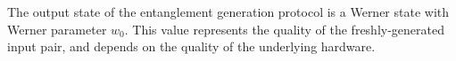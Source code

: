 \documentclass{masterthesis}
\begin{document}
The output state of the entanglement generation protocol is a Werner state with Werner parameter $w_0$. This value represents the quality of the freshly-generated input pair, and depends on the quality of the underlying hardware.






\end{document}
